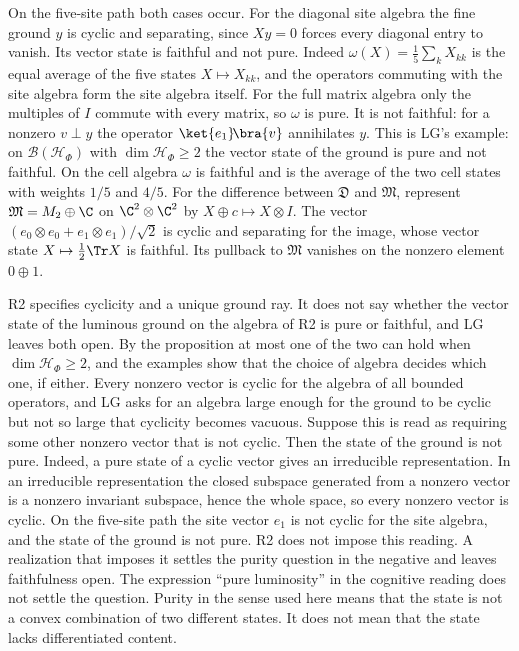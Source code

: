 On the five-site path both cases occur. For the diagonal site algebra the fine ground $y$ is cyclic and separating, since $Xy=0$ forces every diagonal entry to vanish. Its vector state is faithful and not pure. Indeed $\omega(X)=\tfrac15\sum_kX_{kk}$ is the equal average of the five states $X\mapsto X_{kk}$, and the operators commuting with the site algebra form the site algebra itself. For the full matrix algebra only the multiples of $I$ commute with every matrix, so $\omega$ is pure. It is not faithful: for a nonzero $v\perp y$ the operator $\ket{e_1}\!\bra{v}$ annihilates $y$. This is LG's example: on $\mathcal B(\mathcal H_\Phi)$ with $\dim\mathcal H_\Phi\geq2$ the vector state of the ground is pure and not faithful. On the cell algebra $\omega$ is faithful and is the average of the two cell states with weights $1/5$ and $4/5$. For the difference between $\mathfrak D$ and $\mathfrak M$, represent $\mathfrak M=M_2\oplus\C$ on $\C^2\otimes\C^2$ by $X\oplus c\mapsto X\otimes I$. The vector $(e_0\otimes e_0+e_1\otimes e_1)/\sqrt2$ is cyclic and separating for the image, whose vector state $X\mapsto\tfrac12\Tr X$ is faithful. Its pullback to $\mathfrak M$ vanishes on the nonzero element $0\oplus1$.

R2 specifies cyclicity and a unique ground ray. It does not say whether the vector state of the luminous ground on the algebra of R2 is pure or faithful, and LG leaves both open. By the proposition at most one of the two can hold when $\dim\mathcal H_\Phi\geq2$, and the examples show that the choice of algebra decides which one, if either. Every nonzero vector is cyclic for the algebra of all bounded operators, and LG asks for an algebra large enough for the ground to be cyclic but not so large that cyclicity becomes vacuous. Suppose this is read as requiring some other nonzero vector that is not cyclic. Then the state of the ground is not pure. Indeed, a pure state of a cyclic vector gives an irreducible representation. In an irreducible representation the closed subspace generated from a nonzero vector is a nonzero invariant subspace, hence the whole space, so every nonzero vector is cyclic. On the five-site path the site vector $e_1$ is not cyclic for the site algebra, and the state of the ground is not pure. R2 does not impose this reading. A realization that imposes it settles the purity question in the negative and leaves faithfulness open. The expression ``pure luminosity'' in the cognitive reading does not settle the question. Purity in the sense used here means that the state is not a convex combination of two different states. It does not mean that the state lacks differentiated content.
